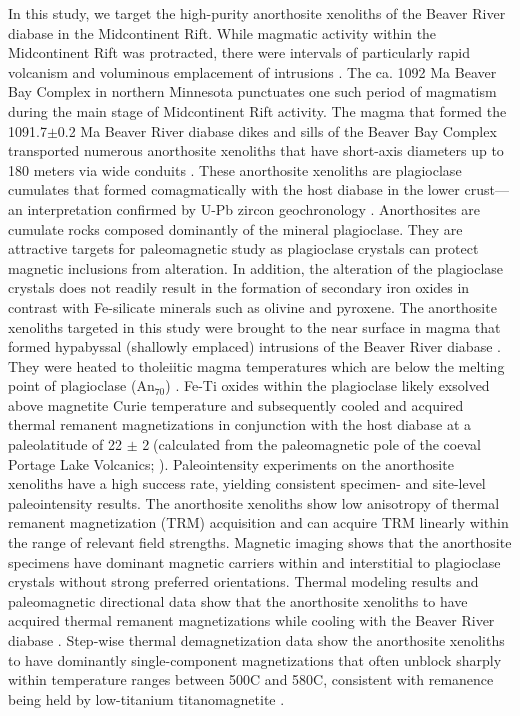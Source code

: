 \documentclass[9pt,twocolumn,twoside,lineno]{pnas-new}
\begin{document}
In this study, we target the high-purity anorthosite xenoliths of the Beaver River diabase in the Midcontinent Rift. While magmatic activity within the Midcontinent Rift was protracted, there were intervals of particularly rapid volcanism and voluminous emplacement of intrusions \cite{Swanson-Hysell2021a}. The ca. 1092 Ma Beaver Bay Complex in northern Minnesota punctuates one such period of magmatism during the main stage of Midcontinent Rift activity. The magma that formed the 1091.7$\pm$0.2 Ma Beaver River diabase dikes and sills of the Beaver Bay Complex transported numerous anorthosite xenoliths that have short-axis diameters up to 180 meters via wide conduits \cite{Boerboom2004a, Boerboom2006b}. These anorthosite xenoliths are plagioclase cumulates that formed comagmatically with the host diabase in the lower crust---an interpretation confirmed by U-Pb zircon geochronology \cite{Zhang2021b}. Anorthosites are cumulate rocks composed dominantly of the mineral plagioclase. They are attractive targets for paleomagnetic study as plagioclase crystals can protect magnetic inclusions from alteration. In addition, the alteration of the plagioclase crystals does not readily result in the formation of secondary iron oxides in contrast with Fe-silicate minerals such as olivine and pyroxene. The anorthosite xenoliths targeted in this study were brought to the near surface in magma that formed hypabyssal (shallowly emplaced) intrusions of the Beaver River diabase \cite{Zhang2021b}. They were heated to tholeiitic magma temperatures which are below the melting point of plagioclase (An$_{70}$) \cite{Zhang2021b}. Fe-Ti oxides within the plagioclase likely exsolved above magnetite Curie temperature \cite{Bian2021a} and subsequently cooled and acquired thermal remanent magnetizations in conjunction with the host diabase at a paleolatitude of 22 $\pm$ 2\textdegree$\;$(calculated from the paleomagnetic pole of the coeval Portage Lake Volcanics; \citealp{Swanson-Hysell2019a}). Paleointensity experiments on the anorthosite xenoliths have a high success rate, yielding consistent specimen- and site-level paleointensity results. The anorthosite xenoliths show low anisotropy of thermal remanent magnetization (TRM) acquisition and can acquire TRM linearly within the range of relevant field strengths. Magnetic imaging shows that the anorthosite specimens have dominant magnetic carriers within and interstitial to plagioclase crystals without strong preferred orientations. Thermal modeling results and paleomagnetic directional data show that the anorthosite xenoliths to have acquired thermal remanent magnetizations while cooling with the Beaver River diabase \cite{Zhang2021b}. Step-wise thermal demagnetization data show the anorthosite xenoliths to have dominantly single-component magnetizations that often unblock sharply within temperature ranges between 500\textdegree C and 580\textdegree C, consistent with remanence being held by low-titanium titanomagnetite \cite{Zhang2021b}. 
\end{document}
